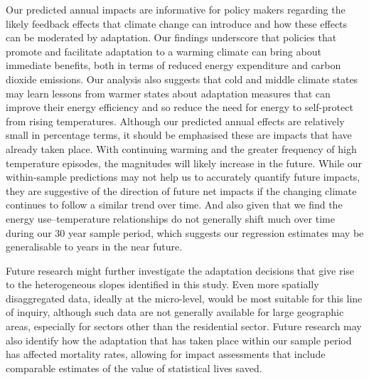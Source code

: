 \documentclass[11pt]{article}
\begin{document}
Our predicted annual impacts are informative for policy makers regarding the likely feedback effects that climate change can introduce and how these effects can be moderated by adaptation. Our findings underscore that policies that promote and facilitate adaptation to a warming climate can bring about immediate benefits, both in terms of reduced energy expenditure and carbon dioxide emissions. Our analysis also suggests that cold and middle climate states may learn lessons from warmer states about adaptation measures that can improve their energy efficiency and so reduce the need for energy to self-protect from rising temperatures. Although our predicted annual effects are relatively small in percentage terms, it should be emphasised these are impacts that have already taken place. With continuing warming and the greater frequency of high temperature episodes, the magnitudes will likely increase in the future. While our within-sample predictions may not help us to accurately quantify future impacts, they are suggestive of the direction of future net impacts if the changing climate continues to follow a similar trend over time. And also given that we find the energy use--temperature relationships do not generally shift much over time during our 30 year sample period, which suggests our regression estimates may be generalisable to years in the near future.

Future research might further investigate the adaptation decisions that give rise to the heterogeneous slopes identified in this study. Even more spatially disaggregated data, ideally at the micro-level, would be most suitable for this line of inquiry, although such data are not generally available for large geographic areas, especially for sectors other than the residential sector. Future research may also identify how the adaptation that has taken place within our sample period has affected mortality rates, allowing for impact assessments that include comparable estimates of the value of statistical lives saved.  



\end{document}
